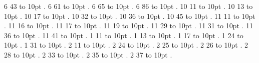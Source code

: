 \smallskip
{} 6 43 \leaders\hbox to 10pt {\hss.\hss}  \hfill {}
\smallskip
{} 6 61 \leaders\hbox to 10pt {\hss.\hss}  \hfill {}
\smallskip
{} 6 65 \leaders\hbox to 10pt {\hss.\hss}  \hfill {}
\smallskip
{} 6 86 \leaders\hbox to 10pt {\hss.\hss}  \hfill {}
\smallskip
{} 10 11 \leaders\hbox to 10pt {\hss.\hss}  \hfill {}
\smallskip
{} 10 13 \leaders\hbox to 10pt {\hss.\hss}  \hfill {}
\smallskip
{} 10 17 \leaders\hbox to 10pt {\hss.\hss}  \hfill {}
\smallskip
{} 10 32 \leaders\hbox to 10pt {\hss.\hss}  \hfill {}
\smallskip
{} 10 36 \leaders\hbox to 10pt {\hss.\hss}  \hfill {}
\smallskip
{} 10 45 \leaders\hbox to 10pt {\hss.\hss}  \hfill {}
\smallskip
{} 11 11 \leaders\hbox to 10pt {\hss.\hss}  \hfill {}
\smallskip
{} 11 16 \leaders\hbox to 10pt {\hss.\hss}  \hfill {}
\smallskip
{} 11 17 \leaders\hbox to 10pt {\hss.\hss}  \hfill {}
\smallskip
{} 11 19 \leaders\hbox to 10pt {\hss.\hss}  \hfill {}
\smallskip
{} 11 29 \leaders\hbox to 10pt {\hss.\hss}  \hfill {}
\smallskip
{} 11 31 \leaders\hbox to 10pt {\hss.\hss}  \hfill {}
\smallskip
{} 11 36 \leaders\hbox to 10pt {\hss.\hss}  \hfill {}
\smallskip
{} 11 41 \leaders\hbox to 10pt {\hss.\hss}  \hfill {}
\smallskip
{} 1 11 \leaders\hbox to 10pt {\hss.\hss}  \hfill {}
\smallskip
{} 1 13 \leaders\hbox to 10pt {\hss.\hss}  \hfill {}
\smallskip
{} 1 17 \leaders\hbox to 10pt {\hss.\hss}  \hfill {}
\smallskip
{} 1 24 \leaders\hbox to 10pt {\hss.\hss}  \hfill {}
\smallskip
{} 1 31 \leaders\hbox to 10pt {\hss.\hss}  \hfill {}
\smallskip
{} 2 11 \leaders\hbox to 10pt {\hss.\hss}  \hfill {}
\smallskip
{} 2 24 \leaders\hbox to 10pt {\hss.\hss}  \hfill {}
\smallskip
{} 2 25 \leaders\hbox to 10pt {\hss.\hss}  \hfill {}
\smallskip
{} 2 26 \leaders\hbox to 10pt {\hss.\hss}  \hfill {}
\smallskip
{} 2 28 \leaders\hbox to 10pt {\hss.\hss}  \hfill {}
\smallskip
{} 2 33 \leaders\hbox to 10pt {\hss.\hss}  \hfill {}
\smallskip
{} 2 35 \leaders\hbox to 10pt {\hss.\hss}  \hfill {}
\smallskip
{} 2 37 \leaders\hbox to 10pt {\hss.\hss}  \hfill {}

